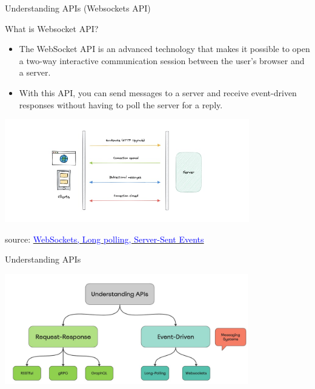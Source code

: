 \documentclass{beamer}
\begin{document}
\begin{frame}[t]{Understanding APIs \small (Websockets API)}

\begin{block}{What is Websocket API?}
		\begin{itemize}
		\scriptsize
			\item<1-> The WebSocket API is an advanced technology that makes it possible to open a two-way interactive communication session between the user's browser and a server.
			\item<2->  With this API, you can send messages to a server and receive event-driven responses without having to poll the server for a reply.
		\end{itemize}
	\end{block}
    
    \begin{center}
   		\includegraphics[width=0.8\textwidth, height=0.5\textheight]{img/websockets.jpeg}
    \end{center}
    
    \tiny { source: \href{https://dev.to/karanpratapsingh/system-design-long-polling-websockets-server-sent-events-sse-1hip}{\textcolor{blue}{WebSockets, Long polling, Server-Sent Events}}}
\end{frame}

\begin{frame}[t]{Understanding APIs}
\center
	\begin{center}
   		\includegraphics[width=0.8\textwidth, height=0.7\textheight]{img/understanding-apis.jpg}
    \end{center}
\end{frame}
\end{document}
